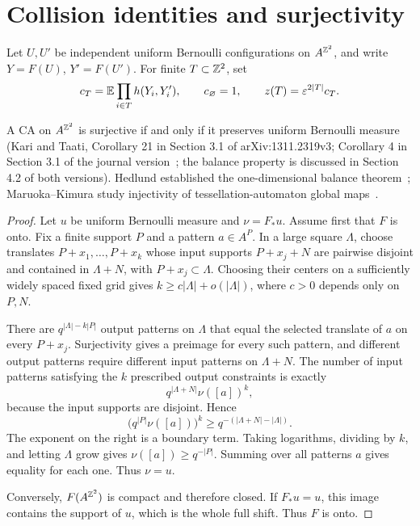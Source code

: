 \section{Collision identities and surjectivity}\label{sec:collision}

Let \(U,U'\) be independent uniform Bernoulli configurations on \(A^{\mathbb Z^2}\), and write \(Y=F(U)\), \(Y'=F(U')\). For finite \(T\subset\mathbb Z^2\), set
\begin{equation}
 c_T=\mathbb E\prod_{i\in T}h(Y_i,Y_i'),\qquad c_\varnothing=1,
 \qquad z(T)=\varepsilon^{2|T|}c_T.
 \label{eq:c}
\end{equation}

\begin{remark}\label{lem:balance}
A CA on \(A^{\mathbb Z^2}\) is surjective if and only if it preserves uniform Bernoulli measure (Kari and Taati, Corollary 21 in Section 3.1 of arXiv:1311.2319v3; Corollary 4 in Section 3.1 of the journal version~\cite{KT}; the balance property is discussed in Section 4.2 of both versions). Hedlund established the one-dimensional balance theorem~\cite{Hedlund}; Maruoka--Kimura study injectivity of tessellation-automaton global maps~\cite{MK76}.
\end{remark}
\begin{proof}
Let \(u\) be uniform Bernoulli measure and \(\nu=F_*u\). Assume first that \(F\) is onto. Fix a finite support \(P\) and a pattern \(a\in A^P\). In a large square \(\Lambda\), choose translates \(P+x_1,\ldots,P+x_k\) whose input supports \(P+x_j+N\) are pairwise disjoint and contained in \(\Lambda+N\), with \(P+x_j\subset\Lambda\). Choosing their centers on a sufficiently widely spaced fixed grid gives \(k\ge c|\Lambda|+o(|\Lambda|)\), where \(c>0\) depends only on \(P,N\).

There are \(q^{|\Lambda|-k|P|}\) output patterns on \(\Lambda\) that equal the selected translate of \(a\) on every \(P+x_j\). Surjectivity gives a preimage for every such pattern, and different output patterns require different input patterns on \(\Lambda+N\). The number of input patterns satisfying the \(k\) prescribed output constraints is exactly
\begin{equation}
 q^{|\Lambda+N|}\nu([a])^k,
\end{equation}
because the input supports are disjoint. Hence
\begin{equation}
 \bigl(q^{|P|}\nu([a])\bigr)^k
 \ge q^{-(|\Lambda+N|-|\Lambda|)}.
\end{equation}
The exponent on the right is a boundary term. Taking logarithms, dividing by \(k\), and letting \(\Lambda\) grow gives \(\nu([a])\ge q^{-|P|}\). Summing over all patterns \(a\) gives equality for each one. Thus \(\nu=u\).

Conversely, \(F(A^{\mathbb Z^2})\) is compact and therefore closed. If \(F_*u=u\), this image contains the support of \(u\), which is the whole full shift. Thus \(F\) is onto.
\end{proof}

